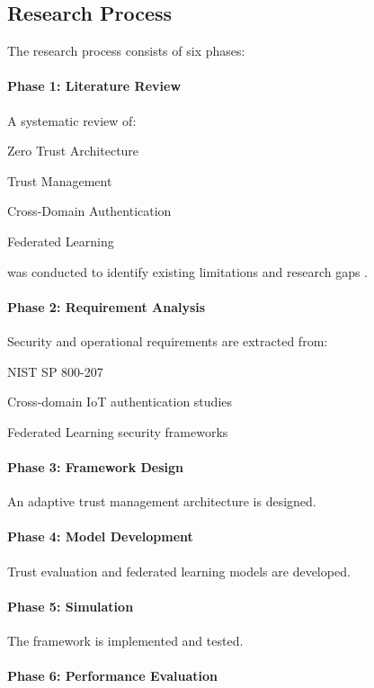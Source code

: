 \subsection{Research Process}

The research process consists of six phases:


\paragraph{Phase 1: Literature Review}

A systematic review of:


Zero Trust Architecture


Trust Management


Cross-Domain Authentication


Federated Learning


was conducted to identify existing limitations and research gaps .


\paragraph{Phase 2: Requirement Analysis}

Security and operational requirements are extracted from:


NIST SP 800-207


Cross-domain IoT authentication studies


Federated Learning security frameworks


\paragraph{Phase 3: Framework Design}

An adaptive trust management architecture is designed.


\paragraph{Phase 4: Model Development}

Trust evaluation and federated learning models are developed.


\paragraph{Phase 5: Simulation}

The framework is implemented and tested.


\paragraph{Phase 6: Performance Evaluation}

